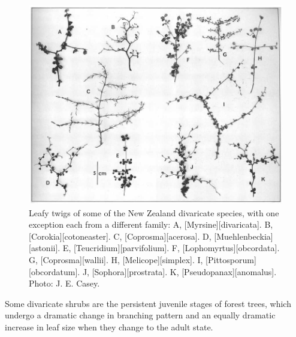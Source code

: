 \begin{figure}[htb]
\begin{minipage}[t]{0.633\textwidth}
    	\centering
    	\includegraphics[width=\textwidth]{graphics/figure77twigs.jpg}
    	\caption[Leafy twigs of some of the New Zealand divaricate species]{Leafy twigs of some of the New Zealand divaricate species, with one exception each from a different family: A, [Myrsine][divaricata].
    	B, [Corokia][cotoneaster].
    	C, [Coprosma][acerosa].
    	D, [Muehlenbeckia][astonii].
    	E, [Teucridium][parvifolium].
    	F, [Lophomyrtus][obcordata].
    	G, [Coprosma][wallii].
    	H, [Melicope][simplex].
    	I, [Pittosporum][obcordatum].
    	J, [Sophora][prostrata].
    	K, [Pseudopanax][anomalus].
    	Photo:  J. E. Casey.}%
    	\label{fig:77twigs}
	\end{minipage}
\end{figure}

Some divaricate shrubs are the persistent juvenile stages of forest trees, which undergo a dramatic change in branching pattern and an equally dramatic increase in leaf size when they change to the adult state.

